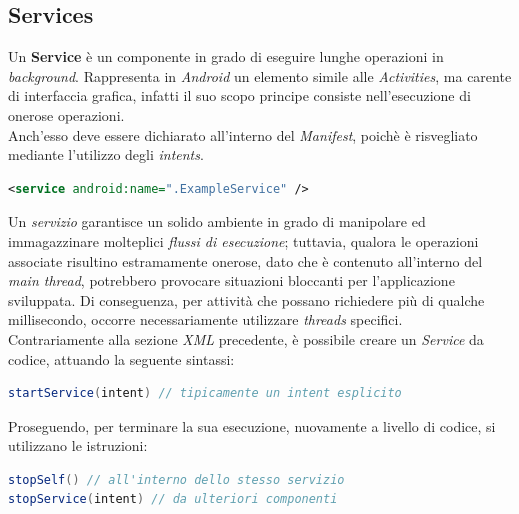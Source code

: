 \documentclass{article}
\begin{document}
\subsection*{Services}
Un \textbf{Service} è un componente in grado di eseguire lunghe operazioni in \textit{background}. Rappresenta in \textit{Android} un elemento simile alle \textit{Activities}, ma carente di interfaccia grafica, infatti il suo scopo principe consiste nell'esecuzione di onerose operazioni.\vspace*{7pt}\\
Anch'esso deve essere dichiarato all'interno del \textit{Manifest}, poichè è risvegliato mediante l'utilizzo degli \textit{intents}.
\begin{lstlisting}[language=XML]
<service android:name=".ExampleService" />
\end{lstlisting}
Un \textit{servizio} garantisce un solido ambiente in grado di manipolare ed immagazzinare molteplici \textit{flussi di esecuzione}; tuttavia, qualora le operazioni associate risultino estramamente onerose, dato che è contenuto all'interno del \textit{main thread}, potrebbero provocare situazioni bloccanti per l'applicazione sviluppata. Di conseguenza, per attività che possano richiedere più di qualche millisecondo, occorre necessariamente utilizzare \textit{threads} specifici.\vspace*{7pt}\\
Contrariamente alla sezione \textit{XML} precedente, è possibile creare un \textit{Service} da codice, attuando la seguente sintassi:
\begin{lstlisting}[language=JAVA]
startService(intent) // tipicamente un intent esplicito
\end{lstlisting}  
Proseguendo, per terminare la sua esecuzione, nuovamente a livello di codice, si utilizzano le istruzioni:
\begin{lstlisting}[language=JAVA]
stopSelf() // all'interno dello stesso servizio
stopService(intent) // da ulteriori componenti
\end{lstlisting}  
\end{document}

